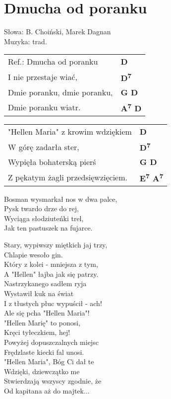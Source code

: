 \section{Dmucha od poranku}

Słowa: B. Choiński, Marek Dagnan\\
Muzyka:  trad.

\vspace{2em}
\begin{tabular}{@{}p{7cm}@{}l@{}}
Ref.: Dmucha od poranku  & \bfseries   D \\
I nie przestaje wiać,  & \bfseries   D\textsuperscript{7} \\
Dmie poranku, dmie poranku,  & \bfseries   G D \\
Dmie poranku wiatr.  & \bfseries   A\textsuperscript{7} D \\
\end{tabular}

\vspace{1em}
\begin{tabular}{@{}p{7cm}@{}l@{}}
"Hellen Maria" z krowim wdziękiem  & \bfseries   D \\
W górę zadarła ster,  & \bfseries   D\textsuperscript{7} \\
Wypięła bohaterską pierś  & \bfseries   G D \\
Z pękatym żagli przedsięwzięciem.  & \bfseries   E\textsuperscript{7} A\textsuperscript{7} \\
\end{tabular}

\vspace{1em}
Bosman wysmarkał nos w dwa palce, \\
Pysk twardo drze do rej, \\
Wyciąga słodziuteńki trel, \\
Jak ten pastuszek na fujarce. \\

\begin{multicols}{2}
Stary, wypiwszy miętkich jaj trzy, \\
Chlapie wesoło gin. \\
Który z kolei - mniejsza z tym, \\
A "Hellen" łajba jak się patrzy. \\

Nastrzykanego sadłem ryja \\
Wystawił kuk na świat \\
I z tłustych płuc wypuścił - ach! \\
Ale się pcha "Hellen Maria"! \\

"Hellen Marię" to ponosi, \\
Kręci tyłeczkiem, hej! \\
Powyżej dopuszczalnych miejsc \\
Frędzlaste kiecki fal unosi. \\

"Hellen Maria", Bóg Ci dał te \\
Wdzięki, dziewczątko me  \\
Stwierdzają wszyscy zgodnie, że \\
Od kapitana aż do majtek...
\end{multicols}